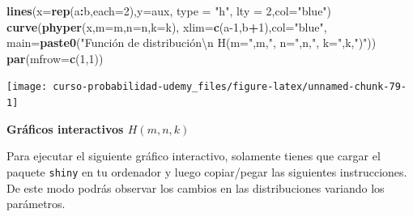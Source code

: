 \documentclass[]{book}
\newenvironment{Shaded}{\begin{snugshade}}{\end{snugshade}}
\newcommand{\DataTypeTok}[1]{\textcolor[rgb]{0.13,0.29,0.53}{#1}}
\newcommand{\DecValTok}[1]{\textcolor[rgb]{0.00,0.00,0.81}{#1}}
\newcommand{\KeywordTok}[1]{\textcolor[rgb]{0.13,0.29,0.53}{\textbf{#1}}}
\newcommand{\NormalTok}[1]{#1}
\newcommand{\OperatorTok}[1]{\textcolor[rgb]{0.81,0.36,0.00}{\textbf{#1}}}
\newcommand{\StringTok}[1]{\textcolor[rgb]{0.31,0.60,0.02}{#1}}
\begin{document}
\begin{Shaded}
\begin{Highlighting}[]
\KeywordTok{lines}\NormalTok{(}\DataTypeTok{x=}\KeywordTok{rep}\NormalTok{(a}\OperatorTok{:}\NormalTok{b,}\DataTypeTok{each=}\DecValTok{2}\NormalTok{),}\DataTypeTok{y=}\NormalTok{aux, }\DataTypeTok{type =} \StringTok{"h"}\NormalTok{, }\DataTypeTok{lty =} \DecValTok{2}\NormalTok{,}\DataTypeTok{col=}\StringTok{"blue"}\NormalTok{)}
\KeywordTok{curve}\NormalTok{(}\KeywordTok{phyper}\NormalTok{(x,}\DataTypeTok{m=}\NormalTok{m,}\DataTypeTok{n=}\NormalTok{n,}\DataTypeTok{k=}\NormalTok{k),}
  \DataTypeTok{xlim=}\KeywordTok{c}\NormalTok{(a}\DecValTok{-1}\NormalTok{,b}\OperatorTok{+}\DecValTok{1}\NormalTok{),}\DataTypeTok{col=}\StringTok{"blue"}\NormalTok{,}
  \DataTypeTok{main=}\KeywordTok{paste0}\NormalTok{(}\StringTok{"Función de distribución\textbackslash{}n H(m="}\NormalTok{,m,}\StringTok{", n="}\NormalTok{,n,}\StringTok{", k="}\NormalTok{,k,}\StringTok{")"}\NormalTok{))}
\KeywordTok{par}\NormalTok{(}\DataTypeTok{mfrow=}\KeywordTok{c}\NormalTok{(}\DecValTok{1}\NormalTok{,}\DecValTok{1}\NormalTok{))}
\end{Highlighting}
\end{Shaded}

\begin{center}\texttt{[image: curso-probabilidad-udemy\_files/figure-latex/unnamed-chunk-79-1]} \end{center}

\textbf{Gráficos interactivos \(H(m,n,k)\)}

Para ejecutar el siguiente gráfico interactivo, solamente tienes que cargar el paquete \texttt{shiny} en tu ordenador y luego copiar/pegar las siguientes instrucciones. De este modo podrás observar los cambios en las distribuciones variando los parámetros.
\end{document}
